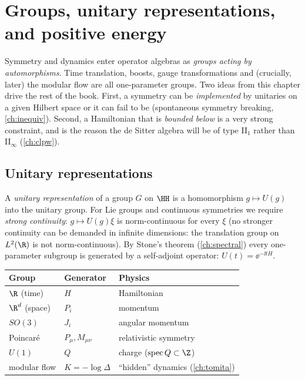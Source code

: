 \chapter{Groups, unitary representations, and positive energy}\label{ch:groups}

\begin{physmotiv}
Symmetry and dynamics enter operator algebras as \emph{groups acting by automorphisms}. Time translation, boosts, gauge transformations and (crucially, later) the modular flow are all one-parameter groups. Two ideas from this chapter drive the rest of the book. First, a symmetry can be \emph{implemented} by unitaries on a given Hilbert space or it can fail to be (spontaneous symmetry breaking, \cref{ch:inequiv}). Second, a Hamiltonian that is \emph{bounded below} is a very strong constraint, and is the reason the de Sitter algebra will be of type II$_1$ rather than II$_\infty$ (\cref{ch:clpw}).
\end{physmotiv}

\section{Unitary representations}

A \emph{unitary representation} of a group $G$ on $\HH$ is a homomorphism $g\mapsto U(g)$ into the unitary group. For Lie groups and continuous symmetries we require \emph{strong continuity}: $g\mapsto U(g)\xi$ is norm-continuous for every $\xi$ (no stronger continuity can be demanded in infinite dimensions: the translation group on $L^2(\R)$ is not norm-continuous). By Stone's theorem (\cref{ch:spectral}) every one-parameter subgroup is generated by a self-adjoint operator: $U(t)=\ee^{-\ii tH}$.

\begin{center}
\renewcommand{\arraystretch}{1.25}
\begin{tabular}{@{}lll@{}}
\toprule
Group & Generator & Physics\\
\midrule
$\R$ (time) & $H$ & Hamiltonian\\
$\R^d$ (space) & $P_i$ & momentum\\
$SO(3)$ & $J_i$ & angular momentum\\
Poincar\'e & $P_\mu,M_{\mu\nu}$ & relativistic symmetry\\
$U(1)$ & $Q$ & charge ($\mathrm{spec}\,Q\subset\Z$)\\
modular flow & $K=-\log\Delta$ & ``hidden'' dynamics (\cref{ch:tomita})\\
\bottomrule
\end{tabular}
\end{center}

